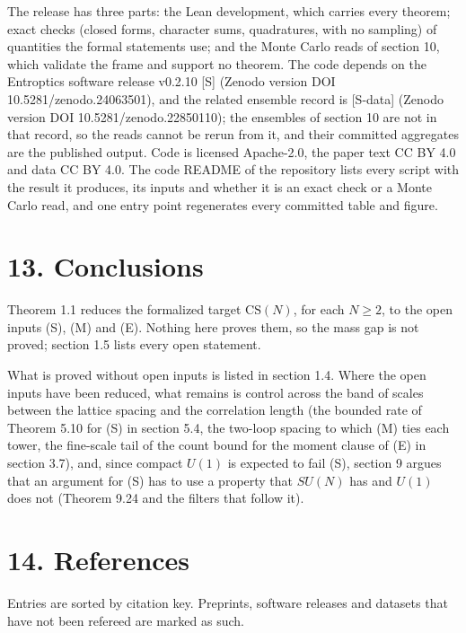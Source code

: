 \documentclass[10pt,letterpaper,twocolumn]{article}
\begin{document}
The release has three parts: the Lean development, which carries every theorem; exact checks (closed forms, character sums, quadratures, with no sampling) of quantities the formal statements use; and the Monte Carlo reads of section 10, which validate the frame and support no theorem. The code depends on the Entroptics software release v0.2.10 {[}S{]} (Zenodo version DOI 10.\allowbreak{}5281/\allowbreak{}zenodo.\allowbreak{}24063501\allowbreak{})\allowbreak{}, and the related ensemble record is {[}S-data{]} (Zenodo version DOI 10.\allowbreak{}5281/\allowbreak{}zenodo.\allowbreak{}22850110\allowbreak{})\allowbreak{}; the ensembles of section 10 are not in that record, so the reads cannot be rerun from it, and their committed aggregates are the published output. Code is licensed Apache-2.0, the paper text CC BY 4.0 and data CC BY 4.0. The code README of the repository lists every script with the result it produces, its inputs and whether it is an exact check or a Monte Carlo read, and one entry point regenerates every committed table and figure.

\section{13. Conclusions}\label{13-conclusions}

Theorem 1.1 reduces the formalized target \(\mathrm{CS}(N)\), for each \(N\ge2\), to the open inputs (S), (M) and (E). Nothing here proves them, so the mass gap is not proved; section 1.5 lists every open statement.

What is proved without open inputs is listed in section 1.4. Where the open inputs have been reduced, what remains is control across the band of scales between the lattice spacing and the correlation length (the bounded rate of Theorem 5.10 for (S) in section 5.4, the two-loop spacing to which (M) ties each tower, the fine-scale tail of the count bound for the moment clause of (E) in section 3.7), and, since compact \(U(1)\) is expected to fail (S), section 9 argues that an argument for (S) has to use a property that \(SU(N)\) has and \(U(1)\) does not (Theorem 9.24 and the filters that follow it).

\section{14. References}\label{14-references}

Entries are sorted by citation key. Preprints, software releases and datasets that have not been refereed are marked as such.
\end{document}
